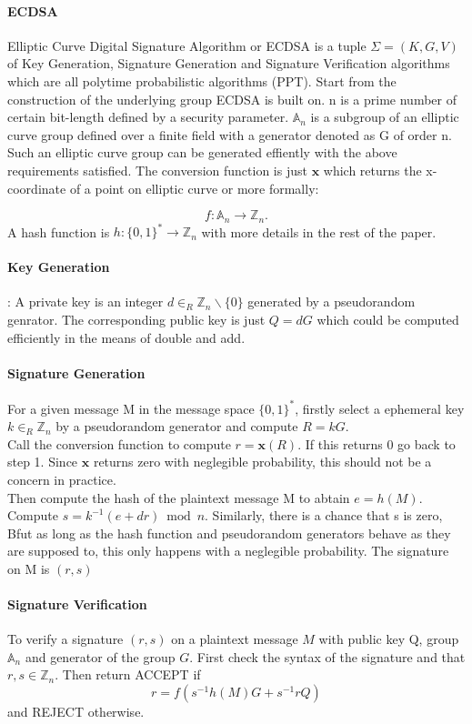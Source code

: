\documentclass[12]{article}
\begin{document}
\paragraph{ECDSA}
Elliptic Curve Digital Signature Algorithm or ECDSA is a tuple $\Sigma=(K,G,V)$ of Key Generation, Signature Generation and Signature Verification algorithms which are all polytime probabilistic algorithms (PPT).
Start from the construction of the underlying group ECDSA is built on.
n is a prime number of certain bit-length defined by a security parameter.
$\mathbb{A}_n$ is a subgroup of an elliptic curve group defined over a finite field with a generator denoted as G of order n.
Such an elliptic curve group can be generated effiently with the above requirements satisfied.
The conversion function is just $\mathbf{x}$ which returns the x-coordinate of a point on elliptic curve or more formally:

\begin{equation*}
f: \mathbb{A}_n \to \mathbb{Z}_n.
\end{equation*}
A hash function is $h:\{0,1\}^* \to \mathbb{Z}_n$ with more details in the rest of the paper.\\
\paragraph{Key Generation}: A private key is an integer $d\in _R \mathbb{Z}_n \backslash \{0\}$ generated by a pseudorandom genrator.
The corresponding public key is just $Q=dG$ which could be computed efficiently in the means of double and add.
\paragraph{Signature Generation}
For a given message M in the message space $\{0,1\}^*$, firstly select a ephemeral key $k\in_R \mathbb{Z}_n$ by a pseudorandom generator and compute $R=kG$. \\
Call the conversion function to compute $r=\mathbf{x}(R)$. If this returns 0 go back to step 1. Since $\mathbf{x}$ returns zero with neglegible probability, this should not be a concern in practice.\\
Then compute the hash of the plaintext message M to abtain $e=h(M)$. Compute $s=k^{-1}(e+dr) \bmod n$. Similarly, there is a chance that s is zero, Bfut as long as the hash function and pseudorandom generators behave as they are supposed to,
this only happens with a neglegible probability. The signature on M is $(r,s)$
\paragraph{Signature Verification}
To verify a signature $(r,s)$ on a plaintext message $M$ with public key Q, group $\mathbb{A}_n$ and generator of the group $G$. First check the syntax of the signature and that $r,s \in \mathbb{Z}_n$. Then return ACCEPT if
\begin{equation*}
r=f(s^{-1}h(M)G+s^{-1}rQ)
\end{equation*}
and REJECT otherwise.
\end{document}
